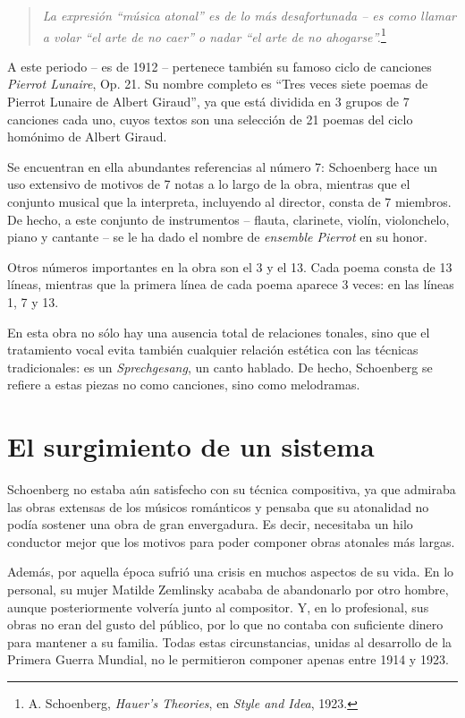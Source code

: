 		\begin{quote}
			\emph{La expresión “música atonal” es de lo más desafortunada -- es como llamar a volar “el arte de no caer” o nadar “el arte de no ahogarse”.}\footnote{A. Schoenberg, \emph{Hauer's Theories}, en \emph{Style and Idea}, 1923.}
		\end{quote}
				
		A este periodo -- es de 1912 -- pertenece también su famoso ciclo de canciones \emph{Pierrot Lunaire}, Op. 21. Su nombre completo es ``Tres veces siete poemas de Pierrot Lunaire de Albert Giraud'', ya que está dividida en 3 grupos de 7 canciones cada uno, cuyos textos son una selección de 21 poemas del ciclo homónimo de Albert Giraud. 
		
		Se encuentran en ella abundantes referencias al número 7: Schoenberg hace un uso extensivo de motivos de 7 notas a lo largo de la obra, mientras que el conjunto musical que la interpreta, incluyendo al director, consta de 7 miembros. De hecho, a este conjunto de instrumentos -- flauta, clarinete, violín, violonchelo, piano y cantante -- se le ha dado el nombre de \textit{ensemble Pierrot} en su honor. 
		
		Otros números importantes en la obra son el 3 y el 13. Cada poema consta de 13 líneas, mientras que la primera línea de cada poema aparece 3 veces: en las líneas 1, 7 y 13.
		
		En esta obra no sólo hay una ausencia total de relaciones tonales, sino que el tratamiento vocal evita también cualquier relación estética con las técnicas tradicionales: es un \emph{Sprechgesang}, un canto hablado. De hecho, Schoenberg se refiere a estas piezas no como canciones, sino como melodramas. \cite{diaz}
		
	\section{El surgimiento de un sistema}
		Schoenberg no estaba aún satisfecho con su técnica compositiva, ya que admiraba las obras extensas de los músicos románticos y pensaba que su atonalidad no podía sostener una obra de gran envergadura. Es decir, necesitaba un hilo conductor mejor que los motivos para poder componer obras atonales más largas.
		
		Además, por aquella época sufrió una crisis en muchos aspectos de su vida. En lo personal, su mujer Matilde Zemlinsky acababa de abandonarlo por otro hombre, aunque posteriormente volvería junto al compositor. Y, en lo profesional, sus obras no eran del gusto del público, por lo que no contaba con suficiente dinero para mantener a su familia. Todas estas circunstancias, unidas al desarrollo de la Primera Guerra Mundial, no le permitieron componer apenas entre 1914 y 1923.
		
